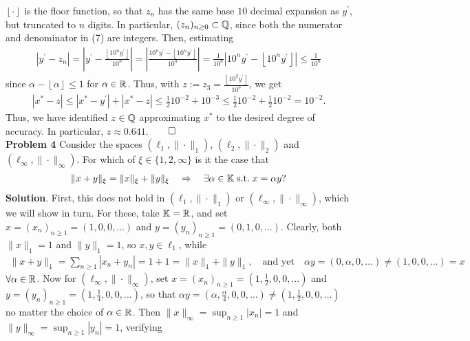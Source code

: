 \documentclass[10pt]{article}
\newcommand{\1}[1]{\mathbbm{1}_{#1}} \newcommand{\mc}[1]{\mathcal{#1}}
\newcommand*{\floor}[1]{\left\lfloor#1\right\rfloor}
\begin{document}
    $\floor{\cdot}$ is the floor function, so that $z_n$ has the same base $10$
    decimal expansion as $y^\prime$, but truncated to $n$ digits. In particular,
    $(z_n)_{n\geq 0}\subset\mathbb{Q}$, since both the numerator and denominator in
    (7) are integers. Then, estimating
    \begin{align*}
        |y^\prime-z_n|=\left|y^\prime-\frac{\floor{10^ny^\prime}}{10^n}\right|=\left|\frac{10^ny^\prime-\floor{10^ny^\prime}}{10^n}\right|=\frac{1}{10^n}|10^ny^\prime-\floor{10^ny^\prime}|\leq \frac{1}{10^n}
    \end{align*}
    since $\alpha-\floor{\alpha}\leq 1$ for $\alpha\in\mathbb{R}$. Thus, with
    $z:=z_3=\tfrac{\floor{10^3y^\prime}}{10^3}$, we get
    \begin{align*}
        |x^\ast-z|\leq|x^\ast-y^\prime|+|x^\ast-z|\leq \frac{1}{2}10^{-2}+10^{-3}\leq \frac{1}{2}10^{-2}+\frac{1}{2}10^{-2}=10^{-2}.
    \end{align*}
    Thus, we have identified $z\in\mathbb{Q}$ approximating $x^\ast$ to the desired
    degree of accuracy. In particular, $z\approx0.641$.\hfill{$\qed$}\\[5pt]
    {\bf Problem 4} Consider the spaces $(\ell_1,\|\cdot\|_1)$,
    $(\ell_2,\|\cdot\|_2)$ and $(\ell_\infty,\|\cdot\|_\infty)$. For which of
    $\xi\in\{1,2,\infty\}$ is it the case that
    \begin{align*}
        \|x+y\|_\xi=\|x\|_\xi+\|y\|_\xi\quad\Rightarrow\quad\exists\alpha\in\mathbb{K}\;\text{s.t.}\;x=\alpha y?
    \end{align*}
    {\bf Solution}. First, this does not hold in $(\ell_1,\|\cdot\|_1)$ or
    $(\ell_\infty,\|\cdot\|_\infty)$, which we will show in turn. For these,
    take $\mathbb{K}=\mathbb{R}$, and set $x=(x_n)_{n\geq 1}=(1,0,0,\dots)$ and
    $y=(y_n)_{n\geq 1}=(0,1,0,\dots)$. Clearly, both $\|x\|_1=1$ and
    $\|y\|_1=1$, so $x,y\in\ell_1$, while
    \begin{align*}
        \|x+y\|_1=\sum_{n\geq 1}|x_n+y_n|=1+1=\|x\|_1+\|y\|_1,\quad\text{and yet}\quad \alpha y=(0,\alpha,0,\dots)\neq (1,0,0,\dots)=x
    \end{align*}
    $\forall \alpha\in\mathbb{R}$. Now for $(\ell_\infty,\|\cdot\|_\infty)$, set
    $x=(x_n)_{n\geq 1}=(1,\tfrac{1}{2},0,0,\dots)$ and $y=(y_n)_{n\geq
    1}=(1,\tfrac{1}{4},0,0,\dots)$, so that $\alpha
    y=(\alpha,\tfrac{\alpha}{4},0,0,\dots)\neq(1,\tfrac{1}{2},0,0,\dots)$ no
    matter the choice of $\alpha\in\mathbb{R}$. Then $\|x\|_\infty=\sup_{n\geq
    1}|x_n|=1$ and $\|y\|_\infty=\sup_{n\geq 1}|y_n|=1$, verifying
\end{document}
